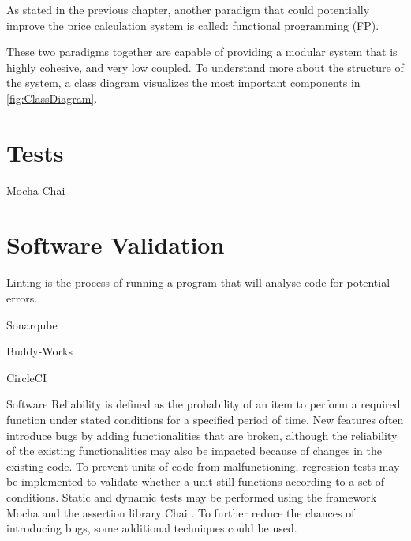 As stated in the previous chapter, another paradigm that could potentially improve the price calculation system is called: functional programming (FP).

These two paradigms together are capable of providing a modular system that is highly cohesive, and very low coupled. To understand more about the structure of the system, a class diagram visualizes the most important components in \ref{fig:ClassDiagram}.

%
\section{Tests}
Mocha
Chai

%
\section{Software Validation}

Linting is the process of running a program that will analyse code for potential errors.

Sonarqube

Buddy-Works

CircleCI

Software Reliability is defined as the probability of an item to perform a required function under stated conditions for a specified period of time. New features often introduce bugs by adding functionalities that are broken, although the reliability of the existing functionalities may also be impacted because of changes in the existing code. To prevent units of code from malfunctioning, regression tests may be implemented to validate whether a unit still functions according to a set of conditions. Static and dynamic tests may be performed using the framework Mocha \cite{mocha} and the assertion library Chai \cite{chai}. To further reduce the chances of introducing bugs, some additional techniques could be used.

%
